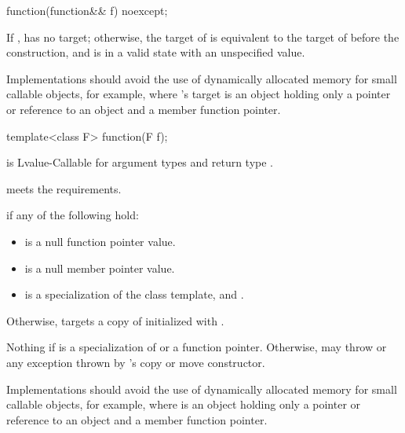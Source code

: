 %
\begin{itemdecl}
function(function&& f) noexcept;
\end{itemdecl}

\begin{itemdescr}
\pnum
\ensures
If ,  has no target;
otherwise, the target of  is equivalent to
the target of  before the construction, and
 is in a valid state with an unspecified value.

\pnum
\recommended
Implementations should avoid the use of
dynamically allocated memory for small callable objects, for example,
where 's target is an object holding only a pointer or reference
to an object and a member function pointer.
\end{itemdescr}

%
\begin{itemdecl}
template<class F> function(F f);
\end{itemdecl}

\begin{itemdescr}
\pnum
\constraints
{} is Lvalue-Callable for argument types
 and return type .

\pnum
\expects
{} meets the  requirements.

\pnum
\ensures
{} if any of the following hold:
\begin{itemize}
\item {} is a null function pointer value.
\item {} is a null member pointer value.
\item {} is a specialization of the  class template, and
  .
\end{itemize}

\pnum
Otherwise,  targets a copy of 
initialized with .

\pnum
\throws
Nothing if  is
a specialization of  or
a function pointer. Otherwise, may throw 
or any exception thrown by 's copy or move constructor.

\pnum
\recommended
Implementations should avoid the use of
dynamically allocated memory for small callable objects, for example,
where  is an object holding only a pointer or
reference to an object and a member function pointer.
\end{itemdescr}


